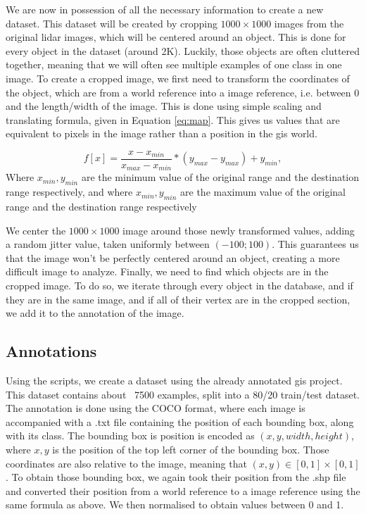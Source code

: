 We are now in possession of all the necessary information to create a new dataset. This dataset will be created by cropping $1000 \times 1000$ images from the original \gls{lidar} images, which will be centered around an object. This is done for every object in the dataset (around 2K). Luckily, those objects are often cluttered together, meaning that we will often see multiple examples of one class in one image. To create a cropped image, we first need to transform the coordinates of the object, which are from a world reference into a image reference, i.e. between 0 and the length/width of the image. This is done using simple scaling and translating formula, given in Equation \ref{eq:map}. This gives us values that are equivalent to pixels in the image rather than a position in the \gls{gis} world. 

\begin{equation}\label{eq:map}
	f[x] = \frac{x - x_{min}}{x_{max} - x_{min}}*(y_{max} - y_{max}) + y_{min}, 
\end{equation} Where $x_{min}, y_{min}$ are the minimum value of the original range and the destination range respectively, and  where  $x_{min}, y_{min}$ are the maximum value of the original range and the destination range respectively

We center the $1000 \times 1000$ image around those newly transformed values, adding a random jitter value, taken uniformly between $(-100; 100)$. This guarantees us that the image won't be perfectly centered around an object, creating a more difficult image to analyze. Finally, we need to find which objects are in the cropped image. To do so, we iterate through every object in the database, and if they are in the same image, and if all of their vertex are in the cropped section, we add it to the annotation of the image. 

\subsection{Annotations}
Using the scripts, we create a dataset using the already annotated \gls{gis} project. This dataset contains about ~7500 examples, split into a 80/20 train/test dataset. The annotation is done using the COCO format\cite{msCOCO}, where each image is accompanied with a .txt file containing the position of each bounding box, along with its class. The bounding box is position is encoded as  $(x, y, width, height)$, where $x, y$ is the position of the top left corner of the bounding box. Those coordinates are also relative to the image, meaning that $(x,y) \in [0,1] \times [0,1]$. To obtain those bounding box, we again took their position from the .shp file and converted their position from a world reference to a image reference using the same formula as above. We then normalised to obtain values between 0 and 1. 

